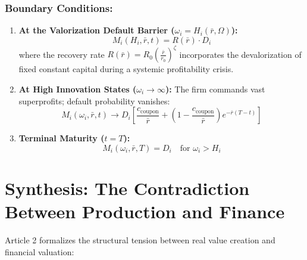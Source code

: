 \documentclass[11pt,letterpaper]{report}
\begin{document}
\subsubsection{Boundary Conditions:}
\begin{enumerate}
\item \textbf{At the Valorization Default Barrier (${\omega }_{i}={H}_{i}(\bar{r},\Omega )$):}
\[
{M}_{i}({H}_{i},\bar{r},t)=R(\bar{r})\cdot {D}_{i}
\]
where the recovery rate $R(\bar{r})={R}_{0}{\left({\frac{\bar{r}}{{r}_{0}}}\right)}^{\zeta }$ incorporates the devalorization of fixed constant capital during a systemic profitability crisis.
\item \textbf{At High Innovation States (${\omega }_{i}\rightarrow \infty$):}
The firm commands vast superprofits; default probability vanishes:
\[
{M}_{i}({\omega }_{i},\bar{r},t)\rightarrow {D}_{i}\left[{\frac{{c}_{\mathrm{coupon}}}{\bar{r}}+\left({1-\frac{{c}_{\mathrm{coupon}}}{\bar{r}}}\right){e}^{-\bar{r}(T-t)}}\right]
\]
\item \textbf{Terminal Maturity ($t=T$):}
\[
{M}_{i}({\omega }_{i},\bar{r},T)={D}_{i}\quad\text{for }{\omega }_{i}>{H}_{i}
\]
\end{enumerate}
\section{Synthesis: The Contradiction Between Production and Finance}
Article 2 formalizes the structural tension between real value creation and financial valuation:
\end{document}
